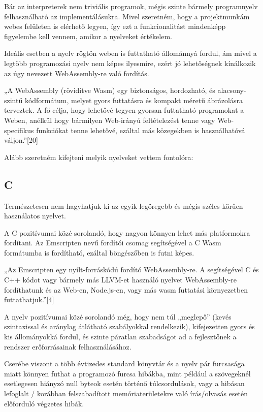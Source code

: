 Bár az interpreterek nem triviális programok, mégis szinte bármely programnyelv felhasználható az implementálásukra. Mivel szeretném, hogy a projektmunkám webes felületen is elérhető legyen, így ezt a funkcionalitást mindenképp figyelembe kell vennem, amikor a nyelveket értékelem.

Ideális esetben a nyelv rögtön weben is futtatható állománnyá fordul, ám mivel a legtöbb programozási nyelv nem képes ilyesmire, ezért jó lehetőségnek kínálkozik az úgy nevezett WebAssembly-re való fordítás.

„A WebAssembly (rövidítve Wasm) egy biztonságos, hordozható, és alacsony-szintű kódformátum, melyet gyors futtatásra és kompakt méretű ábrázolásra terveztek. A fő célja, hogy lehetővé tegyen gyorsan futtatható programokat a Weben, anélkül hogy bármilyen Web-irányú feltételezést tenne vagy Web-specifikus funkciókat tenne lehetővé, ezáltal más közegekben is használhatóvá váljon.”[20]

Alább szeretném kifejteni melyik nyelveket vettem fontolóra:

\newpage

\subsection{C}

Természetesen nem hagyhatjuk ki az egyik legöregebb és mégis széles körűen használatos nyelvet.

A C pozitívumai közé sorolandó, hogy nagyon könnyen lehet más platformokra fordítani. Az Emscripten nevű fordítói csomag segítségével a C Wasm formátumba is fordítható, ezáltal böngészőben is futni képes.

„Az Emscripten egy nyílt-forráskódú fordító WebAssembly-re. A segítségével C és C++ kódot vagy bármely más LLVM-et használó nyelvet WebAssembly-re fordíthatunk és az Web-en, Node.js-en, vagy más wasm futtatási környezetben futtathatjuk.”[4]

A nyelv pozitívumai közé sorolandó még, hogy nem túl „meglepő” (kevés szintaxissal és aránylag átlátható szabályokkal rendelkezik), kifejezetten gyors és kis állományokká fordul, és szinte páratlan szabadságot ad a fejlesztőnek a rendszer erőforrásainak felhasználásához.

Cserébe  viszont a több évtizedes standard könyvtár és a nyelv pár furcsasága miatt könnyen futhat a programozó furcsa hibákba, mint például a szövegeknél esetlegesen hiányzó null byteok esetén történő túlcsordulások, vagy a hibásan lefoglalt / korábban felszabadított memóriaterületekre való írás/olvasás esetén előforduló végzetes hibák.

